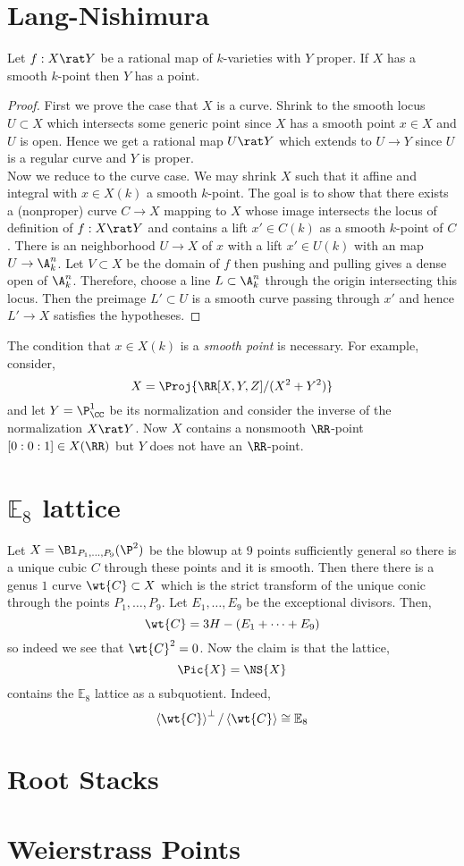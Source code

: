 \documentclass[12pt]{article}
\begin{document}
\section{Lang-Nishimura}

\begin{theorem}
Let $f : X \rat Y$  be a rational map of $k$-varieties with $Y$ proper. If $X$ has a smooth $k$-point then $Y$ has a point.
\end{theorem}

\begin{proof}
First we prove the case that $X$ is a curve. Shrink to the smooth locus $U \subset X$ which intersects some generic point since $X$ has a smooth point $x \in X$ and $U$ is open. Hence we get a rational map $U \rat Y$ which extends to $U \to Y$ since $U$ is a regular curve and $Y$ is proper. 
\bigskip\\
Now we reduce to the curve case. We may shrink $X$ such that it affine and integral with $x \in X(k)$ a smooth $k$-point. The goal is to show that there exists a (nonproper) curve $C \to X$ mapping to $X$ whose image intersects the locus of definition of $f : X \rat Y$ and contains a lift $x' \in C(k)$ as a smooth $k$-point of $C$. There is an \etale neighborhood $U \to X$ of $x$ with a lift $x' \in U(k)$ with an \etale map $U \to \A^n_k$. Let $V \subset X$ be the domain of $f$ then pushing and pulling gives a dense open of $\A^n_k$. Therefore, choose a line $L \subset \A^n_k$ through the origin intersecting this locus. Then the preimage $L' \subset U$ is a smooth curve passing through $x'$ and hence $L' \to X$ satisfies the hypotheses. 
\end{proof}

\begin{example}
The condition that $x \in X(k)$ is a \textit{smooth point} is necessary. For example, consider,
\[ X = \Proj{\RR[X,Y,Z]/(X^2 + Y^2)} \]
and let $Y = \P^1_{\CC}$ be its normalization and consider the inverse of the normalization $X \rat Y$. Now $X$ contains a nonsmooth $\RR$-point $[0:0:1] \in X(\RR)$ but $Y$ does not have an $\RR$-point. 
\end{example}

\newcommand{\bb}{\mathbb}

\section{$\bb{E}_8$ lattice}

Let $X = \Bl_{P_1, \dots, P_9}(\P^2)$ be the blowup at $9$ points sufficiently general so there is a unique cubic $C$ through these points and it is smooth. Then there there is a genus $1$ curve $\wt{C} \subset X$ which is the strict transform of the unique conic through the points $P_1, \dots, P_9$. Let $E_1, \dots, E_9$ be the exceptional divisors. Then,
\[ \wt{C} = 3 H - (E_1 + \cdots + E_9) \]
so indeed we see that $\wt{C}^2 = 0$. Now the claim is that the lattice,
\[ \Pic{X} = \NS{X} \]
contains the $\bb{E}_8$ lattice as a subquotient. Indeed,
\[ \left< \wt{C} \right>^\perp / \left< \wt{C} \right> \cong \bb{E}_8 \]

\section{Root Stacks}

\section{Weierstrass Points}
\end{document}
